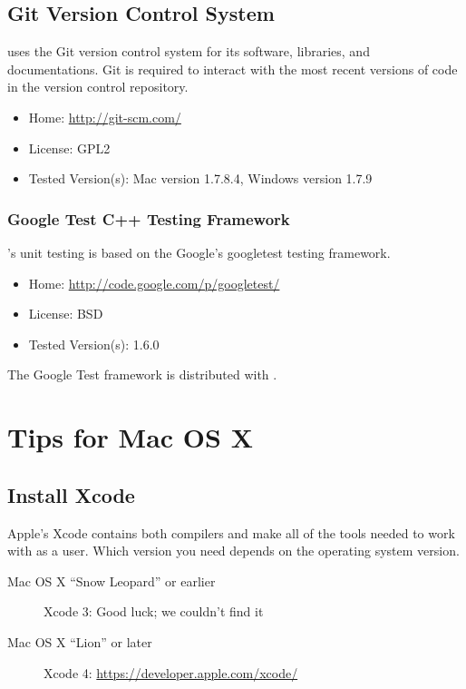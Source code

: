 \subsection{Git Version Control System}

\Stan uses the Git version control system for its software, libraries,
and documentations.  Git is required to interact with the most recent
versions of code in the version control repository.
% 
\begin{itemize}
\item Home: \url{http://git-scm.com/}
\item License: GPL2
\item Tested Version(s): Mac version 1.7.8.4, Windows version 1.7.9
\end{itemize}


\subsubsection{Google Test C++ Testing Framework}

\Stan's unit testing is based on the Google's googletest \Cpp testing
framework.  
%
\begin{itemize}
\item
Home: \url{http://code.google.com/p/googletest/}
\item
License: BSD
\item
Tested Version(s): 1.6.0
\end{itemize}
%
The Google Test framework is distributed with \Stan.


\section{Tips for Mac OS X}

\subsection{Install Xcode}

Apple's Xcode contains both compilers and make all of the tools needed 
to work with \Stan as a user.  Which version you need depends on the
operating system version.

\begin{description}
\item[Mac OS X ``Snow Leopard'' or earlier]
Xcode 3: Good luck; we couldn't find it
\item[Mac OS X ``Lion'' or later]
Xcode 4: \url{https://developer.apple.com/xcode/}
\end{description}

